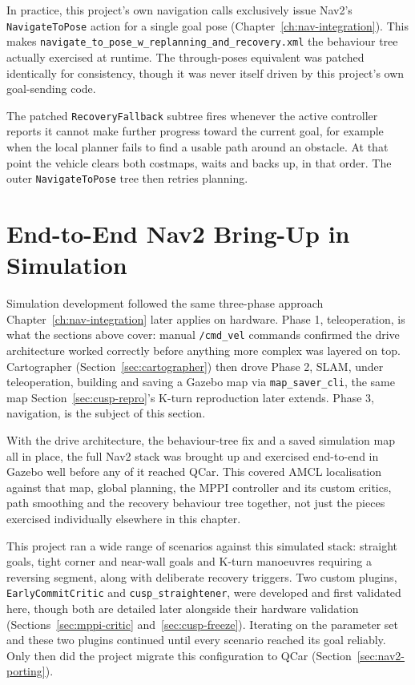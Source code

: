 In practice, this project's own navigation calls exclusively issue
Nav2's \texttt{NavigateToPose} action for a single goal pose
(Chapter~\ref{ch:nav-integration}). This makes
\texttt{navigate\_to\_pose\_w\_replanning\_and\_recovery.xml} the
behaviour tree actually exercised at runtime. The through-poses
equivalent was patched identically for consistency, though it was
never itself driven by this project's own goal-sending code.

The patched \texttt{RecoveryFallback} subtree fires whenever the
active controller reports it cannot make further progress toward the
current goal, for example when the local planner fails to find a
usable path around an obstacle. At that point the vehicle clears
both costmaps, waits and backs up, in that order. The outer
\texttt{NavigateToPose} tree then retries planning.

\section{End-to-End Nav2 Bring-Up in Simulation}
\label{sec:nav2-sim-bringup}

Simulation development followed the same three-phase approach
Chapter~\ref{ch:nav-integration} later applies on hardware. Phase 1,
teleoperation, is what the sections above cover: manual
\texttt{/cmd\_vel} commands confirmed the drive architecture worked
correctly before anything more complex was layered on top.
Cartographer (Section~\ref{sec:cartographer}) then drove Phase 2,
SLAM, under teleoperation, building and saving a Gazebo map via
\texttt{map\_saver\_cli}, the same map Section~\ref{sec:cusp-repro}'s
K-turn reproduction later extends. Phase 3, navigation, is the
subject of this section.

With the drive architecture, the behaviour-tree fix and a saved
simulation map all in place, the full Nav2 stack was brought up and
exercised end-to-end in Gazebo well before any of it reached QCar.
This covered AMCL localisation against that map, global planning,
the MPPI controller and its custom critics, path smoothing and the
recovery behaviour tree together, not just the pieces exercised
individually elsewhere in this chapter.

This project ran a wide range of scenarios against this simulated
stack: straight goals, tight corner and near-wall goals and K-turn
manoeuvres requiring a reversing segment, along with deliberate
recovery triggers. Two custom plugins, \texttt{EarlyCommitCritic} and
\texttt{cusp\_straightener}, were developed and first validated here,
though both are detailed later alongside their hardware validation
(Sections~\ref{sec:mppi-critic} and~\ref{sec:cusp-freeze}). Iterating
on the parameter set and these two plugins continued until every
scenario reached its goal reliably. Only then did the project migrate
this configuration to QCar (Section~\ref{sec:nav2-porting}).

